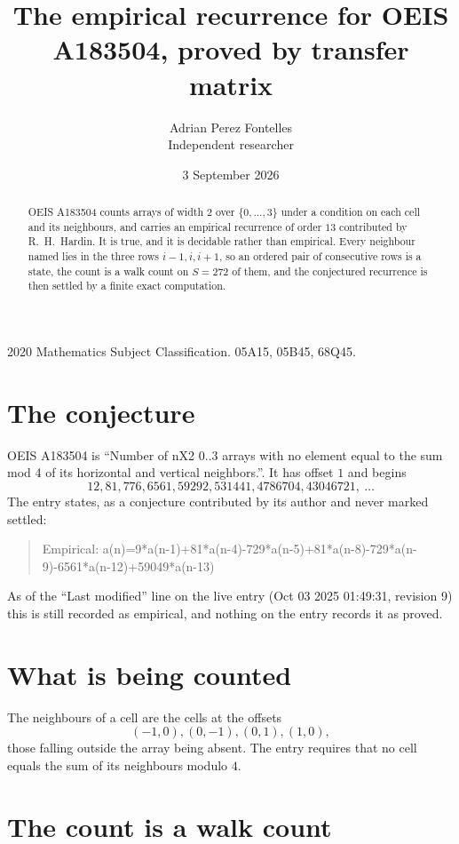 \documentclass[11pt,a4paper]{article}
\title{The empirical recurrence for OEIS A183504, proved by transfer matrix}
\author{Adrian Perez Fontelles\\ \small Independent researcher}
\date{3 September 2026}
\theoremstyle{plain}
\theoremstyle{definition}
\begin{document}
\maketitle

\begin{abstract}
OEIS A183504 counts arrays of width $2$ over $\{0,\dots,3\}$ under a condition on each cell
and its neighbours, and carries an empirical recurrence of order $13$ contributed by
R.~H.~Hardin. It is true, and it is decidable rather than empirical. Every neighbour named lies
in the three rows $i-1,i,i+1$, so an ordered pair of consecutive rows is a state, the count is
a walk count on $S=272$ of them, and the conjectured recurrence is then settled by a finite
exact computation.
\end{abstract}

\noindent\small 2020 Mathematics Subject Classification. 05A15, 05B45, 68Q45.\normalsize

\section{The conjecture}

OEIS A183504 is ``Number of nX2 0..3 arrays with no element equal to the sum mod 4 of its horizontal and vertical neighbors.''. It has offset $1$ and begins
\[
12, 81, 776, 6561, 59292, 531441, 4786704, 43046721,\ \dots
\]
The entry states, as a conjecture contributed by its author and never marked settled:
\begin{quote}
Empirical: a(n)=9*a(n-1)+81*a(n-4)-729*a(n-5)+81*a(n-8)-729*a(n-9)-6561*a(n-12)+59049*a(n-13)
\end{quote}
As of the ``Last modified'' line on the live entry (Oct 03 2025 01:49:31, revision 9) this is still
recorded as empirical, and nothing on the entry records it as proved.

\section{What is being counted}

The neighbours of a cell are the cells at the offsets
\[
(-1,0), (0,-1), (0,1), (1,0),
\]
those falling outside the array being absent. The entry requires that no cell equals the sum of its neighbours modulo $4$.

\section{The count is a walk count}
\end{document}
